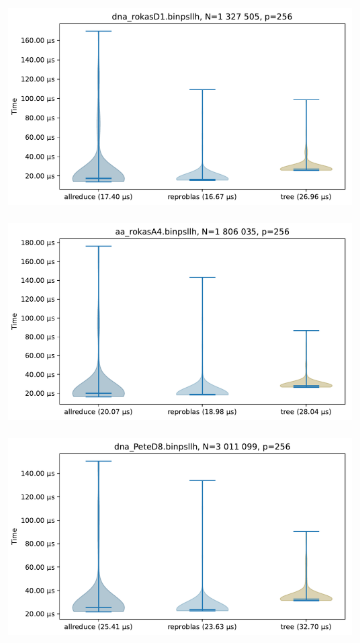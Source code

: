 \begin{figure}\centering\ContinuedFloat

\begin{subfigure}{\textwidth}
\centering
\includegraphics[scale=\mScale]{figures/violinRokasD1.pdf}
\end{subfigure}


\begin{subfigure}{\textwidth}
\centering
\includegraphics[scale=\mScale]{figures/violinRokasA4.pdf}
\end{subfigure}

\begin{subfigure}{\textwidth}
\centering
\includegraphics[scale=\mScale]{figures/violinPeteD8.pdf}
\end{subfigure}

\end{figure}
